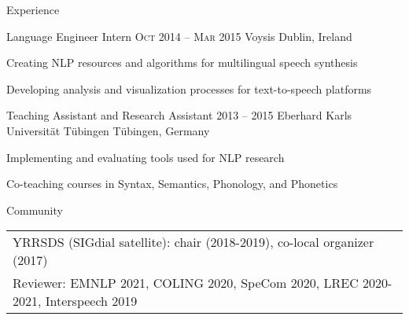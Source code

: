 \documentclass{resume} %
\begin{document}
\begin{rSection}{Experience}
\begin{rSubsection}
	{Language Engineer Intern}
	{\textsc{Oct} 2014 -- \textsc{Mar} 2015}
	{Voysis}
	{Dublin, Ireland}
	
	\setlength{\itemindent}{.7cm}

	\item Creating NLP resources and algorithms for multilingual speech synthesis
	\item Developing analysis and visualization processes for text-to-speech platforms
\end{rSubsection}

\begin{rSubsection}
	{Teaching Assistant and Research Assistant}
	{2013 -- 2015}
	{Eberhard Karls Universität Tübingen}
	{Tübingen, Germany}
	
	\setlength{\itemindent}{.7cm}
	
	\item Implementing and evaluating tools used for NLP research %
	\item Co-teaching courses in Syntax, Semantics, Phonology, and Phonetics %
\end{rSubsection}

%	
%	

%	
%	
%


\end{rSection}


\begin{rSection}{Community}
	\begin{tabular}{l}
		YRRSDS (SIGdial satellite): chair (2018-2019), co-local organizer (2017)\\
		Reviewer: EMNLP 2021, COLING 2020, SpeCom 2020, LREC 2020-2021, Interspeech 2019
	\end{tabular}
\end{rSection}
\end{document}
